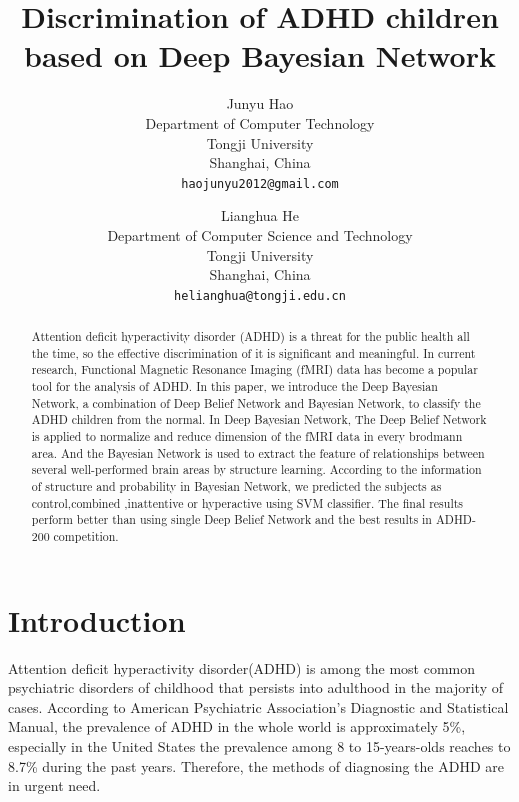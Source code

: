 \documentclass[10pt,twocolumn,letterpaper]{article}
\begin{document}
\title{Discrimination of ADHD children based on Deep Bayesian Network}

\author{Junyu Hao\\
Department of Computer Technology\\
Tongji University\\
Shanghai, China\\
{\tt\small haojunyu2012@gmail.com}
\and
Lianghua He\\
Department of Computer Science and Technology\\
Tongji University\\
Shanghai, China\\
{\tt\small helianghua@tongji.edu.cn}
}

\maketitle

\begin{abstract}
   Attention deficit hyperactivity disorder (ADHD) is a threat for the public health all the time, so the effective discrimination of it is significant and meaningful. In current research, Functional Magnetic Resonance Imaging (fMRI) data has become a popular tool for the analysis of ADHD. In this paper, we introduce the Deep Bayesian Network, a combination of Deep Belief Network and Bayesian Network, to classify the ADHD children from the normal. In Deep Bayesian Network, The Deep Belief Network is applied to  normalize and reduce dimension of the fMRI data in every brodmann area. And the Bayesian Network is used to extract the feature of relationships between several well-performed brain areas by structure learning. According to the information of structure and probability in Bayesian Network, we predicted the subjects as control,combined ,inattentive or hyperactive using SVM classifier. The final results perform better than using single Deep Belief Network and the best results in ADHD-200 competition. 

\end{abstract}

\section{Introduction}
Attention deficit hyperactivity disorder(ADHD) is among the most common psychiatric disorders of childhood that persists into adulthood in the majority of cases\cite{1}. According to American Psychiatric Association's Diagnostic and Statistical Manual, the prevalence of ADHD in the whole world is approximately 5\%, especially in the United States the prevalence among 8 to 15-years-olds reaches to 8.7\% during the past years. Therefore, the methods of diagnosing the ADHD are in urgent need.
 
\end{document}
